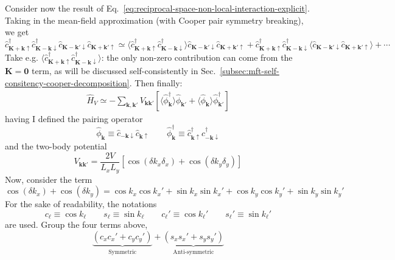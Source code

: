 Consider now the result of Eq.~\eqref{eq:reciprocal-space-non-local-interaction-explicit}. Taking in the mean-field approximation (with Cooper pair symmetry breaking), we get
\[
	\hat c_{\mathbf{K}+\mathbf{k} \uparrow}^\dagger \hat c_{\mathbf{K}-\mathbf{k} \downarrow}^\dagger \hat c_{\mathbf{K}-\mathbf{k}' \downarrow} \hat c_{\mathbf{K}+\mathbf{k}'\uparrow} \simeq \langle
		\hat c_{\mathbf{K}+\mathbf{k} \uparrow}^\dagger \hat c_{\mathbf{K}-\mathbf{k} \downarrow}^\dagger
	\rangle \hat c_{\mathbf{K}-\mathbf{k}' \downarrow} \hat c_{\mathbf{K}+\mathbf{k}'\uparrow} + \hat c_{\mathbf{K}+\mathbf{k} \uparrow}^\dagger \hat c_{\mathbf{K}-\mathbf{k} \downarrow}^\dagger \langle 
		\hat c_{\mathbf{K}-\mathbf{k}' \downarrow} \hat c_{\mathbf{K}+\mathbf{k}'\uparrow}
	\rangle + \cdots
\]
Take e.g. $\langle \hat c_{\mathbf{K}+\mathbf{k} \uparrow}^\dagger \hat c_{\mathbf{K}-\mathbf{k} \downarrow}^\dagger \rangle$: the only non-zero contribution can come from the $\mathbf{K}=\mathbf{0}$ term, as will be discussed self-consistently in Sec.~\ref{subsec:mft-self-consitency-cooper-decomposition}. Then finally:
\[
\begin{aligned}
	\hat H_V \simeq - \sum_{\mathbf{k}, \mathbf{k}'}
	V_{\mathbf{k}\mathbf{k}'} \left[
		\langle 
			\hat \phi_\mathbf{k}^\dagger
		\rangle \hat \phi_{\mathbf{k}'} + \langle 
			\hat \phi_\mathbf{k}
		\rangle \hat \phi_{\mathbf{k}'}^\dagger
	\right]	
\end{aligned}
\]
having I defined the pairing operator 
\[
	\hat \phi_\mathbf{k} \equiv \hat c_{-\mathbf{k}\downarrow} \hat c_{\mathbf{k} \uparrow}
	\qquad
	\hat \phi_\mathbf{k}^\dagger \equiv \hat c_{\mathbf{k} \uparrow}^\dagger \hat c_{-\mathbf{k}\downarrow}^\dagger
\]
and the two-body potential
\[
	V_{\mathbf{k}\mathbf{k}'} = \frac{2V}{L_x L_y} \left[
		\cos \left(
			\delta k_x \delta_x
			\right)	+ \cos \left(
			\delta k_y \delta_y
		\right)	
	\right]
\]
Now, consider the term
\[
	\cos \left( \delta k_x \right)	+ \cos \left( \delta k_y \right) = \cos k_x \cos k_x' + \sin k_x \sin k_x' + \cos k_y \cos k_y' + \sin k_y \sin k_y'
\]
For the sake of readability, the notations
\[
	c_\ell \equiv \cos k_\ell
	\qquad
	s_\ell \equiv \sin k_\ell
	\qquad
	c_\ell' \equiv \cos	k_\ell'
	\qquad
	s_\ell' \equiv \sin k_\ell'
\]
are used. Group the four terms above,
\begin{equation}\label{eq:sym-asym-couplings-gap}
	\underbrace{
		\left(c_x c_x' + c_y c_y' \right) 
	}_\text{Symmetric}
	+ \underbrace{
		\left(s_x s_x' + s_y s_y' \right)
	}_\text{Anti-symmetric}
\end{equation}
